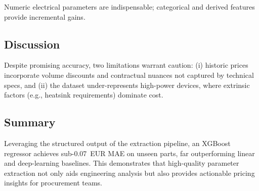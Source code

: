 Numeric electrical parameters are indispensable; categorical and derived features provide incremental gains.

\subsection{Discussion}
Despite promising accuracy, two limitations warrant caution: (i) historic prices incorporate volume discounts and contractual nuances not captured by technical specs, and (ii) the dataset under-represents high-power devices, where extrinsic factors (e.g., heatsink requirements) dominate cost.

\subsection{Summary}
Leveraging the structured output of the extraction pipeline, an XGBoost regressor achieves sub-0.07~EUR MAE on unseen parts, far outperforming linear and deep-learning baselines.  This demonstrates that high-quality parameter extraction not only aids engineering analysis but also provides actionable pricing insights for procurement teams.